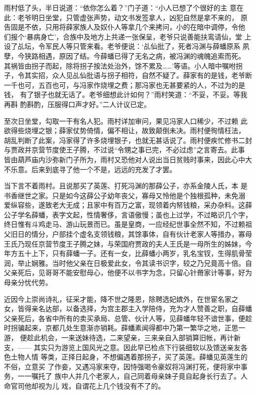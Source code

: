 雨村低了头，半日说道：“依你怎么着？”门子道：“小人已想了个很好的主
意在此：老爷明日坐堂，只管虚张声势，动文书发签拿人，凶犯自然是拿不来的，
原告固是不依，只用将薛家族人及奴仆人等拿几个来拷问，小的在暗中调停，令他
们报个‘暴病身亡’，合族中及地方上共递一张保呈，老爷只说善能扶鸾请仙，堂
上设了乩坛，令军民人等只管来看。老爷便说：‘乩仙批了，死者冯渊与薛蟠原系
夙孽，今狭路相遇，原因了结。今薛蟠已得了无名之病，被冯渊的魂魄追索而死。
其祸皆由拐子而起，除将拐子按法处治外，馀不累及……’等语。小人暗中嘱咐拐
子，令其实招，众人见乩仙批语与拐子相符，自然不疑了。薛家有的是钱，老爷断
一千也可，五百也可，与冯家作烧埋之费；那冯家也无甚要紧的人，不过为的是钱，
有了银子也就无话了。老爷细想此计如何？”雨村笑道：“不妥，不妥。等我再斟
酌斟酌，压服得口声才好。”二人计议已定。

至次日坐堂，勾取一干有名人犯。雨村详加审问，果见冯家人口稀少，不过赖
此欲得些烧埋之银；薛家仗势倚情，偏不相让，故致颠倒未决。雨村便徇情枉法，
胡乱判断了此案，冯家得了许多烧埋银子，也就无甚话说了。雨村便疾忙修书二封
与贾政并京营节度使王子腾，不过说“令甥之事已完，不必过虑”之言寄去。此事
皆由葫芦庙内沙弥新门子所为，雨村又恐他对人说出当日贫贱时事来，因此心中大
不乐意。后来到底寻了他一个不是，远远的充发了才罢。

当下言不着雨村。且说那买了英莲、打死冯渊的那薛公子，亦系金陵人氏，本
是书香继世之家。只是如今这薛公子幼年丧父，寡母又怜他是个独根孤种，未免溺
爱纵容些，遂致老大无成；且家中有百万之富，现领着内帑钱粮，采办杂料。这薛
公子学名薛蟠，表字文起，性情奢侈，言语傲慢；虽也上过学，不过略识几个字，
终日惟有斗鸡走马、游山玩景而已。虽是皇商，一应经纪世事全然不知，不过赖祖
父旧日的情分，户部挂个虚名支领钱粮，其馀事体，自有伙计老家人等措办，寡母
王氏乃现任京营节度王子腾之妹，与荣国府贾政的夫人王氏是一母所生的姊妹，今
年方五十上下，只有薛蟠一子。还有一女，比薛蟠小两岁，乳名宝钗，生得肌骨莹
润，举止娴雅。当时他父亲在日极爱此女，令其读书识字，较之乃兄竟高十倍。自
父亲死后，见哥哥不能安慰母心，他便不以书字为念，只留心针黹家计等事，好为
母亲分忧代劳。

近因今上崇尚诗礼，征采才能，降不世之隆恩，除聘选妃嫔外，在世宦名家之
女，皆得亲名达部，以备选择，为宫主郡主入学陪侍，充为才人赞善之职，自薛蟠
父亲死后，各省中所有的卖买承局、总管、伙计人等，见薛蟠年轻不谙世事，便趁
时拐骗起来，京都几处生意渐亦销耗。薛蟠素闻得都中乃第一繁华之地，正思一游，
便趁此机会，一来送妹待选，二来望亲，三来亲自入部销算旧帐，再计新支，——
其实只为游览上国风光之意。因此早已检点下行装细软以及馈送亲友各色土物人情
等类，正择日起身，不想偏遇着那拐子，买了英莲。薛蟠见英莲生的不俗，立意买
了作妾，又遇冯家来夺，因恃强喝令豪奴将冯渊打死，便将家中事务，一一嘱托了
族中人并几个老家人，自己同着母亲妹子竟自起身长行去了。人命官司他却视为儿
戏，自谓花上几个钱没有不了的。

